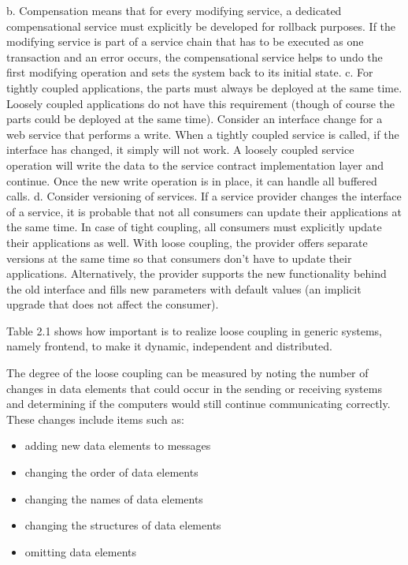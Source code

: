 \newline
b. Compensation means that for every modifying service, a dedicated compensational service must explicitly be developed for rollback purposes. If the modifying service is part of a service chain that has to be executed as one transaction and an error occurs, the compensational service helps to undo the first modifying operation and sets the system back to its initial state. 
\newline
c. For tightly coupled applications, the parts must always be deployed at the same time. Loosely coupled applications do not have this requirement (though of course the parts could be deployed at the same time). Consider an interface change for a web service that performs a write. When a tightly coupled service is called, if the interface has changed, it simply will not work. A loosely coupled service operation will write the data to the service contract implementation layer and continue. Once the new write operation is in place, it can handle all buffered calls. 
\newline
d. Consider versioning of services. If a service provider changes the interface of a service, it is probable that not all consumers can update their applications at the same time. In case of tight coupling, all consumers must explicitly update their applications as well. With loose coupling, the provider offers separate versions at the same time so that consumers don't have to update their applications. Alternatively, the provider supports the new functionality behind the old interface and fills new parameters with default values (an implicit upgrade that does not affect the consumer).

Table 2.1 shows how important is to realize loose coupling in generic systems, namely frontend, to make it dynamic, independent and distributed.

The degree of the loose coupling can be measured by noting the number of changes in data elements that could occur in the sending or receiving systems and determining if the computers would still continue communicating correctly\cite{firestone1984study,danneels2003tight}. These changes include items such as:
\begin{itemize}
\item adding new data elements to messages
\item changing the order of data elements
\item changing the names of data elements
\item changing the structures of data elements
\item omitting data elements
\end{itemize}

